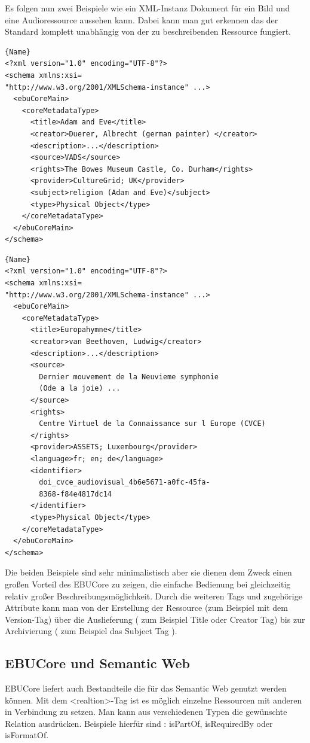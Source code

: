 	Es folgen nun zwei Beispiele wie ein XML-Instanz Dokument für ein Bild und eine Audioressource aussehen kann. Dabei kann man gut erkennen das der Standard komplett unabhängig von der zu beschreibenden Ressource fungiert.

	\begin{lstlisting}[caption=Beispiel-XML EBUCore für Albrecht Dürers Bild: Adam und Eva]{Name}
<?xml version="1.0" encoding="UTF-8"?>
<schema xmlns:xsi=
"http://www.w3.org/2001/XMLSchema-instance" ...>
  <ebuCoreMain>
    <coreMetadataType>
      <title>Adam and Eve</title>
      <creator>Duerer, Albrecht (german painter) </creator>
      <description>...</description>
      <source>VADS</source>  
      <rights>The Bowes Museum Castle, Co. Durham</rights>
      <provider>CultureGrid; UK</provider>
      <subject>religion (Adam and Eve)</subject>
      <type>Physical Object</type>
    </coreMetadataType>
  </ebuCoreMain>
</schema>
	\end{lstlisting}


	\begin{lstlisting}[caption=Beispiel-XML EBUCore für die Europahymne]{Name}
<?xml version="1.0" encoding="UTF-8"?>
<schema xmlns:xsi=
"http://www.w3.org/2001/XMLSchema-instance" ...>
  <ebuCoreMain>
    <coreMetadataType>
      <title>Europahymne</title>
      <creator>van Beethoven, Ludwig</creator>
      <description>...</description>
      <source>
      	Dernier mouvement de la Neuvieme symphonie 
      	(Ode a la joie) ...
      </source>  
      <rights>
      	Centre Virtuel de la Connaissance sur l Europe (CVCE)
      </rights>
      <provider>ASSETS; Luxembourg</provider>
      <language>fr; en; de</language>
      <identifier>
      	doi_cvce_audiovisual_4b6e5671-a0fc-45fa-
      	8368-f84e4817dc14
      </identifier>
      <type>Physical Object</type>
    </coreMetadataType>
  </ebuCoreMain>
</schema>
	\end{lstlisting}

	Die beiden Beispiele sind sehr minimalistisch aber sie dienen dem Zweck einen großen Vorteil des EBUCore zu zeigen, die einfache Bedienung bei gleichzeitig relativ großer Beschreibungsmöglichkeit. Durch die weiteren Tags und zugehörige Attribute kann man von der Erstellung der Ressource (zum Beispiel mit dem Version-Tag) über die Auslieferung ( zum Beispiel Title oder Creator Tag)  bis zur Archivierung ( zum Beispiel das Subject Tag ).

	\subsection{EBUCore und Semantic Web}
	EBUCore liefert auch Bestandteile die für das Semantic Web genutzt werden können. Mit dem <realtion>-Tag ist es möglich einzelne Ressourcen mit anderen in Verbindung zu setzen. Man kann aus verschiedenen Typen die gewünschte Relation ausdrücken. Beispiele hierfür sind : isPartOf, isRequiredBy oder isFormatOf.

